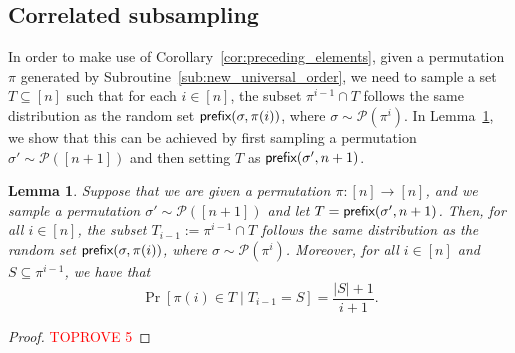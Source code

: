 \documentclass[11pt]{article}
\newcommand{\cP}{\mathcal P}
\newcommand{\pref}{\textnormal{\sffamily prefix}}
\newtheorem{lemma}[theorem]{Lemma}
\begin{document}
\subsection{Correlated subsampling}
In order to make use of Corollary~\ref{cor:preceding_elements}, given a permutation $\pi$ generated by Subroutine~\ref{sub:new_universal_order}, we need to sample a set $T\subseteq[n]$ such that for each $i\in[n]$, the subset $\pi^{i-1}\cap T$ follows the same distribution as the random set $\pref(\sigma,\pi(i))$, where $\sigma\sim\cP(\pi^{i})$. In Lemma~\ref{lem:correlated_sampling_preceding_elements}, we show that this can be achieved by first sampling a permutation $\sigma'\sim\cP([n+1])$ and then setting $T$ as $\pref(\sigma',n+1)$.
\begin{lemma}\label{lem:correlated_sampling_preceding_elements}
Suppose that we are given a permutation $\pi:[n]\to[n]$, and we sample a permutation $\sigma'\sim\cP([n+1])$ and let $T=\pref(\sigma',n+1)$. Then, for all $i\in[n]$, the subset $T_{i-1}:=\pi^{i-1}\cap T$ follows the same distribution as the random set $\pref(\sigma,\pi(i))$, where $\sigma\sim\cP(\pi^{i})$. Moreover, for all $i\in[n]$ and $S\subseteq\pi^{i-1}$, we have that
\begin{equation}\label{eq:P_pi_i_in_T}
\Pr[\pi(i)\in T\mid T_{i-1}=S]=\frac{|S|+1}{i+1}.
\end{equation}
\end{lemma}
\begin{proof}\textcolor{red}{TOPROVE 5}\end{proof}
\end{document}
